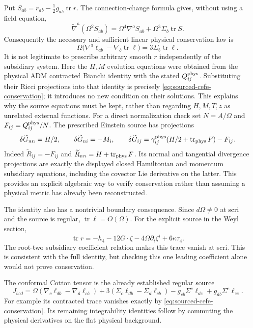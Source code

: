 Put $S_{ab}=r_{ab}-\tfrac12g_{ab}\operatorname{tr}r$.  The connection-change
formula gives, without using a field equation,
\[
 \widetilde\nabla^a(\Omega^2S_{ab})
 =\Omega^4\nabla^aS_{ab}+\Omega^3\Sigma_b\operatorname{tr}S.
\]
Consequently the necessary and sufficient linear physical conservation law is
\begin{equation}
 \Omega\bigl(\nabla^a\ell_{ab}-\nabla_b\operatorname{tr}\ell\bigr)
 =3\Sigma_b\operatorname{tr}\ell.
 \label{eq:sourced-cefe-conservation}
\end{equation}
It is not legitimate to prescribe arbitrary smooth $r$ independently of the
subsidiary system.  Here the $H,M$ evolution equations were obtained from the
physical ADM contracted Bianchi identity with the stated $Q^{\rm phys}_{ij}$.
Substituting their Ricci projections into that identity is precisely
\eqref{eq:sourced-cefe-conservation}; it introduces no new condition on their
solutions.  This explains why the source equations must be kept, rather than
regarding $H,M,T,z$ as unrelated external functions.
For a direct normalization check set $N=A/\Omega$ and
$F_{ij}=Q^{\rm phys}_{ij}/N$.  The prescribed Einstein source has projections
\[
 \delta\widetilde G_{nn}=H/2,\qquad
 \delta\widetilde G_{ni}=-M_i,\qquad
 \delta\widetilde G_{ij}
  =\gamma^{\rm phys}_{ij}(H/2+\operatorname{tr}_{\rm phys}F)-F_{ij}.
\]
Indeed $\widetilde R_{ij}=-F_{ij}$ and
$\widetilde R_{nn}=H+\operatorname{tr}_{\rm phys}F$.
Its normal and tangential divergence projections are exactly the displayed
closed Hamiltonian and momentum subsidiary equations, including the
covector Lie derivative on the latter.  This provides an explicit algebraic
way to verify conservation rather than assuming a physical metric has
already been reconstructed.

The identity also has a nontrivial boundary consequence.  Since $d\Omega\ne0$
at scri and the source is regular, $\operatorname{tr}\ell=O(\Omega)$.  For the
explicit source in the Weyl section,
\[
 \operatorname{tr}r=-h_4-12G\cdot\zeta
       -4\Omega\partial_i\zeta^i+6\kappa\tau_4.
\]
The root-two subsidiary coefficient relation makes this trace vanish at scri.
This is consistent with the full identity, but checking this one leading
coefficient alone would not prove conservation.

The conformal Cotton tensor is the already established regular source
\[
 J_{bcd}=\Omega(\nabla_c\ell_{db}-\nabla_d\ell_{cb})
 +3(\Sigma_c\ell_{db}-\Sigma_d\ell_{cb})
 -g_{cb}\Sigma^e\ell_{de}+g_{db}\Sigma^e\ell_{ce}.
\]
For example its contracted trace vanishes exactly by
\eqref{eq:sourced-cefe-conservation}.  Its remaining integrability identities
follow by commuting the physical derivatives on the flat physical background.

